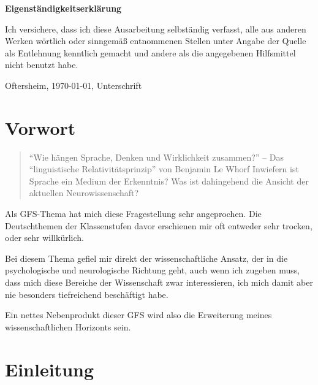 \documentclass[12pt]{scrreprt}
\begin{document}
\makeititle
\begin{center}
	\sffamily\bfseries{Eigenständigkeitserklärung}
\end{center}
Ich versichere, dass ich diese Ausarbeitung selbständig verfasst, alle aus
anderen Werken wörtlich oder sinngemäß entnommenen Stellen unter Angabe der
Quelle als Entlehnung kenntlich gemacht und andere als die angegebenen
Hilfsmittel nicht benutzt habe.

Oftersheim, \today, Unterschrift
\tableofcontents
\listoffigures
\listoftables
\chapter{Vorwort}
	\label{chap:vorwort}
\blockquote{
\enquote{Wie hängen Sprache, Denken und Wirklichkeit
zusammen?} – Das \enquote{linguistische Relativitätsprinzip} von Benjamin Le
Whorf
\smallskip\newline
Inwiefern ist Sprache ein Medium der Erkenntnis?
Was ist dahingehend die Ansicht der aktuellen Neurowissenschaft?}
Als GFS-Thema hat mich diese Fragestellung sehr angeprochen.
Die Deutschthemen der Klassenstufen davor erschienen mir oft entweder sehr
trocken, oder sehr willkürlich.

Bei diesem Thema gefiel mir direkt der wissenschaftliche Ansatz, der in die
psychologische und neurologische Richtung geht, auch wenn ich zugeben muss, dass
mich diese Bereiche der Wissenschaft zwar interessieren, ich mich damit aber nie
besonders tiefreichend beschäftigt habe.

Ein nettes Nebenprodukt dieser GFS wird also die Erweiterung meines
wissenschaftlichen Horizonts sein.
\chapter{Einleitung}
\label{chap:einleitung}
\end{document}
